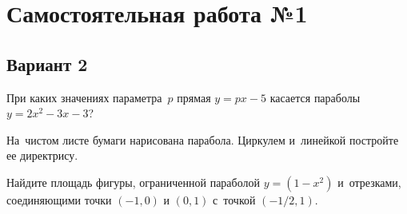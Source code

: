 
\section*{Самостоятельная работа №1}

\subsection*{Вариант 2}

\begin{problems}

\item
При каких значениях параметра~$p$ прямая $y = p x - 5$ касается параболы
\\
$y = 2 x^2 - 3 x - 3$?

\item
На~чистом листе бумаги нарисована парабола.
Циркулем и~линейкой постройте ее директрису.

\end{problems}

\vspace{-1.5ex}

\begin{minipage}[t][][b]{0.155\linewidth}
\end{minipage}
\hfill
\begin{minipage}[t][][b]{0.835\linewidth}
\begin{problems}
\item
Найдите площадь фигуры, ограниченной параболой \mbox{$y = (1 - x^2)$}
и~отрезками,
соединяющими точки $(-1, 0)$ и $(0, 1)$ с~точкой $(-1/2, 1)$.
\end{problems}
\end{minipage}

